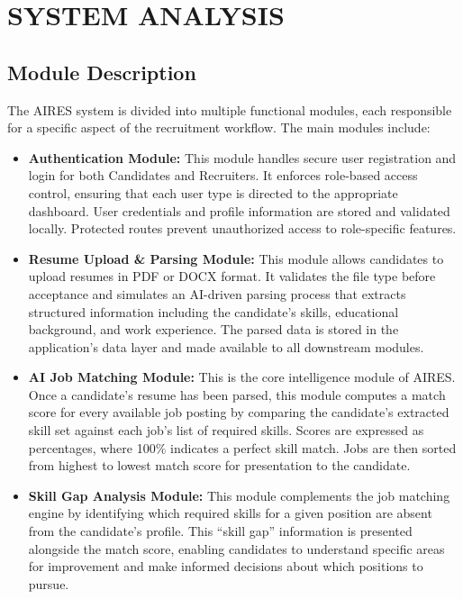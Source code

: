 \chapter{SYSTEM ANALYSIS }
 
 \section{Module Description}
 The AIRES system is divided into multiple functional modules, each responsible for a specific aspect of the recruitment workflow. The main modules include:
 \begin{itemize}
    \item \textbf{Authentication Module:} This module handles secure user registration and login for both Candidates and Recruiters. It enforces role-based access control, ensuring that each user type is directed to the appropriate dashboard. User credentials and profile information are stored and validated locally. Protected routes prevent unauthorized access to role-specific features.
    
    \item \textbf{Resume Upload \& Parsing Module:} This module allows candidates to upload resumes in PDF or DOCX format. It validates the file type before acceptance and simulates an AI-driven parsing process that extracts structured information including the candidate's skills, educational background, and work experience. The parsed data is stored in the application's data layer and made available to all downstream modules.
    
    \item \textbf{AI Job Matching Module:} This is the core intelligence module of AIRES. Once a candidate's resume has been parsed, this module computes a match score for every available job posting by comparing the candidate's extracted skill set against each job's list of required skills. Scores are expressed as percentages, where 100\% indicates a perfect skill match. Jobs are then sorted from highest to lowest match score for presentation to the candidate.
    
    \item \textbf{Skill Gap Analysis Module:} This module complements the job matching engine by identifying which required skills for a given position are absent from the candidate's profile. This ``skill gap'' information is presented alongside the match score, enabling candidates to understand specific areas for improvement and make informed decisions about which positions to pursue.
    

\end{itemize}
